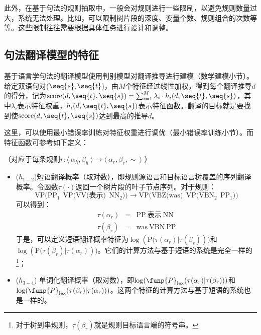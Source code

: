 \parinterval 此外，在基于句法的规则抽取中，一般会对规则进行一些限制，以避免规则数量过大，系统无法处理。比如，可以限制树片段的深度、变量个数、规则组合的次数等等。这些限制往往需要根据具体任务进行设计和调整。


\subsection{句法翻译模型的特征}

\parinterval 基于语言学句法的翻译模型使用判别模型对翻译推导进行建模（{\chapterseven}数学建模小节）。给定双语句对($\seq{s}$,$\seq{t}$)，由$M$个特征经过线性加权，得到每个翻译推导$d$的得分，记为$\textrm{score(}d,\seq{t},\seq{s})=\sum_{i=1}^{M} \lambda_i \cdot h_{i}(d,\seq{t},\seq{s})$，其中$\lambda_i$表示特征权重，$h_{i}(d,\seq{t},\seq{s})$表示特征函数。翻译的目标就是要找到使$\textrm{score(}d,\seq{t},\seq{s})$达到最高的推导$d$。

\parinterval 这里，可以使用最小错误率训练对特征权重进行调优（{\chapterseven}最小错误率训练小节）。而特征函数可参考如下定义：

\vspace{0.5em}
（对应于每条规则$r : \langle\  \alpha_h, \beta_h\ \rangle \to \langle\ \alpha_r, \beta_r, \sim\ \rangle$ ）

\begin{itemize}
\vspace{0.5em}
\item ($h_{1-2}$)短语翻译概率（取对数），即规则源语言和目标语言树覆盖的序列翻译概率。令函数$\tau(\cdot)$返回一个树片段的叶子节点序列。对于规则：
\begin{displaymath}
\textrm{VP(}\textrm{PP}_1\ \ \textrm{VP(VV(表示)}\ \ \textrm{NN}_2\textrm{))} \rightarrow \textrm{VP(VBZ(was)}\ \ \textrm{VP(}\textrm{VBN}_2\ \ \textrm{PP}_1\textrm{))}
\end{displaymath}
\noindent 可以得到：
\begin{eqnarray}
\tau( \alpha_r ) & = & \textrm{PP}\ \textrm{表示}\ \textrm{NN} \nonumber \\
\tau( \beta_r ) & = & \textrm{was}\ \textrm{VBN}\ \textrm{PP} \nonumber
\end{eqnarray}
\noindent 于是，可以定义短语翻译概率特征为$\log(\textrm{P(}\tau( \alpha_r )|\tau( \beta_r )))$和$\log(\textrm{P(}\tau( \beta_r )|\tau( \alpha_r )))$。它们的计算方法与基于短语的系统是完全一样的\footnote[9]{对于树到串规则，$\tau( \beta_r )$就是规则目标语言端的符号串。}；
\vspace{0.5em}
\item ($h_{3-4}$) 单词化翻译概率（取对数），即$\log(\funp{P}_{\textrm{lex}}(\tau( \alpha_r )|\tau( \beta_r )))$和$\log(\funp{P}_{\textrm{lex}}(\tau( \beta_r )|\tau( \alpha_r )))$。这两个特征的计算方法与基于短语的系统也是一样的。
\vspace{0.5em}
\end{itemize}

